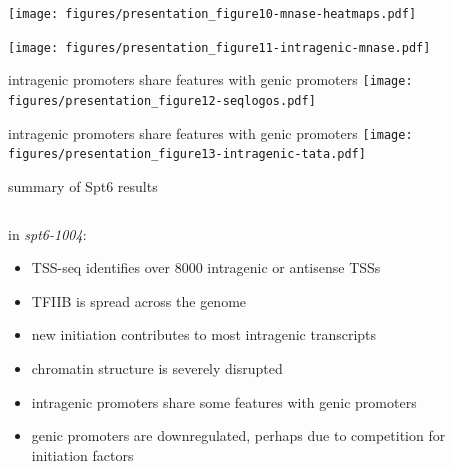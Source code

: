 \documentclass[aspectratio=169]{beamer}
\begin{document}
\begin{frame}
\texttt{[image: figures/presentation\_figure10-mnase-heatmaps.pdf]}
\end{frame}

\begin{frame}
\texttt{[image: figures/presentation\_figure11-intragenic-mnase.pdf]}
\end{frame}

\begin{frame}{intragenic promoters share features with genic promoters}
    \texttt{[image: figures/presentation\_figure12-seqlogos.pdf]}
\end{frame}

\begin{frame}{intragenic promoters share features with genic promoters}
    \texttt{[image: figures/presentation\_figure13-intragenic-tata.pdf]}
\end{frame}

\begin{frame}{summary of Spt6 results}
    \begin{columns}
        \begin{column}{0.5\textwidth}
            in \textit{spt6-1004}:
            \begin{itemize}
                \item TSS-seq identifies over 8000 intragenic or antisense TSSs
                \item TFIIB is spread across the genome
                \item new initiation contributes to most intragenic transcripts
                \item chromatin structure is severely disrupted
                \item intragenic promoters share some features with genic promoters
                \item genic promoters are downregulated, perhaps due to competition for initiation factors
            \end{itemize}
        \end{column}
        \begin{column}{0.5\textwidth}
        \end{column}
    \end{columns}
\end{frame}
\end{document}
